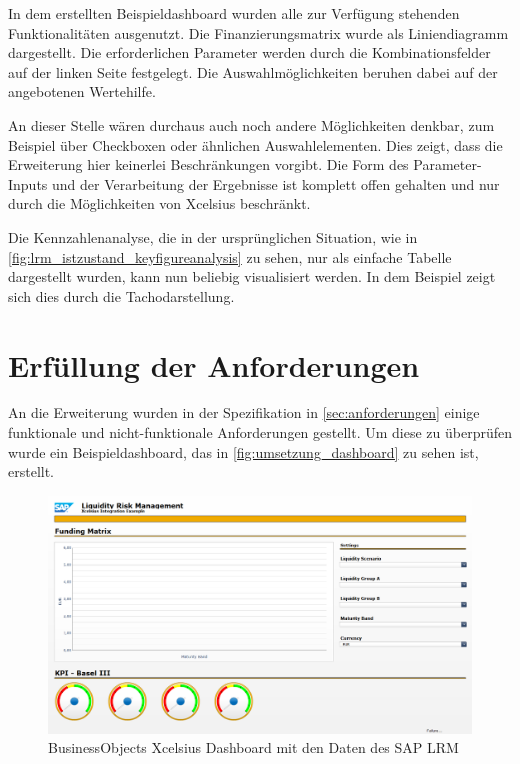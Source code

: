 \begin{onehalfspacing}
In dem erstellten Beispieldashboard wurden alle zur Verfügung stehenden Funktionalitäten ausgenutzt. Die Finanzierungsmatrix wurde als Liniendiagramm dargestellt. Die erforderlichen Parameter werden durch die Kombinationsfelder auf der linken Seite festgelegt. Die Auswahlmöglichkeiten beruhen dabei auf der angebotenen Wertehilfe. 

An dieser Stelle wären durchaus auch noch andere Möglichkeiten denkbar, zum Beispiel über Checkboxen oder ähnlichen Auswahlelementen. Dies zeigt, dass die Erweiterung hier keinerlei Beschränkungen vorgibt. Die Form des Parameter-Inputs und der Verarbeitung der Ergebnisse ist komplett offen gehalten und nur durch die Möglichkeiten von Xcelsius beschränkt.

Die Kennzahlenanalyse, die in der ursprünglichen Situation, wie in \vref{fig:lrm_istzustand_keyfigureanalysis} zu sehen, nur als einfache Tabelle dargestellt wurden, kann nun beliebig visualisiert werden. In dem Beispiel zeigt sich dies durch die Tachodarstellung.


\section{Erfüllung der Anforderungen}
An die Erweiterung wurden in der Spezifikation in \vref{sec:anforderungen} einige funktionale und nicht-funktionale Anforderungen gestellt. Um diese zu überprüfen wurde ein Beispieldashboard, das in \vref{fig:umsetzung_dashboard} zu sehen ist, erstellt.

\begin{figure}[h]
\centering
\setlength{\unitlength}{1mm}
\includegraphics[width=15cm]{images/dashboard_preview.PNG}
\caption{BusinessObjects Xcelsius Dashboard mit den Daten des SAP LRM\label{fig:umsetzung_dashboard}}
\end{figure}  


\end{onehalfspacing}
